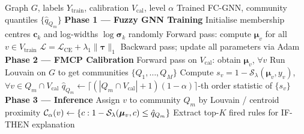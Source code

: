 \begin{algorithm}[t]
\caption{FC-GNN Training and Calibration}
\label{alg:training}
\begin{algorithmic}[1]
\Require Graph $G$, labels $Y_\text{train}$, calibration $V_\text{cal}$,
         level $\alpha$
\Ensure Trained FC-GNN, community quantiles $\{\hat{q}_{Q_m}\}$
\State \textbf{Phase 1 — Fuzzy GNN Training}
\State Initialise membership centres $\bm{c}_k$ and log-widths
       $\log\bm{\sigma}_k$ randomly
  \State Forward pass: compute $\bm{\mu}_v$ for all $v \in V_\text{train}$
  \State $\mathcal{L} = \mathcal{L}_\text{CE} +
         \lambda_1 \|\bm{\tau}\|_1$
  \State Backward pass; update all parameters via Adam
\EndFor
\State \textbf{Phase 2 — FMCP Calibration}
\State Forward pass on $V_\text{cal}$: obtain $\bm{\mu}_v$, $\forall v$
\State Run Louvain on $G$ to get communities $\{Q_1, \ldots, Q_M\}$
  \State Compute $s_v = 1 - \mathcal{S}_\lambda(\bm{\mu}_v, y_v)$,
         $\forall v \in Q_m \cap V_\text{cal}$
  \State $\hat{q}_{Q_m} \leftarrow \lceil(|Q_m \cap V_\text{cal}|+1)(1-\alpha)\rceil$-th
         order statistic of $\{s_v\}$
\EndFor
\State \textbf{Phase 3 — Inference}
  \State Assign $v$ to community $Q_m$ by Louvain / centroid proximity
  \State $\mathcal{C}_\alpha(v) \leftarrow \{c : 1 - \mathcal{S}_\lambda(\bm{\mu}_v, c)
         \le \hat{q}_{Q_m}\}$
  \State Extract top-$K$ fired rules for IF-THEN explanation
\EndFor
\end{algorithmic}
\end{algorithm}
